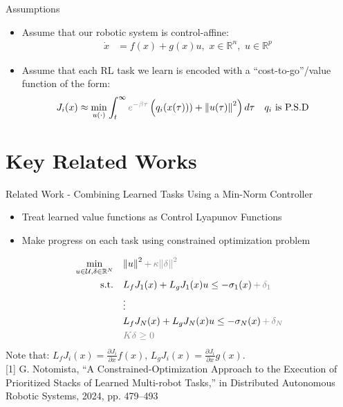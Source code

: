 \begin{frame}{Assumptions}
	\begin{itemize}
		\item{Assume that our robotic system is control-affine:
	\begin{align*}
		\dot{x} &= f(x) + g(x)u, \,\, x \in \mathbb{R}^n, \,\, u \in \mathbb{R}^p
	\end{align*}}
		\item{Assume that each RL task we learn is encoded with a ``cost-to-go''/value function of the form:
	\begin{align*}
		J_i (x) &\approx \min_{u(\cdot)} \int_t^{\infty} { \color{gray} e^{- \beta \tau} } \left( q_i(x(\tau))) + {\lVert u(\tau) \rVert}^2 \right) d \tau && \text{$q_i$ is P.S.D}
	\end{align*}}
	\end{itemize}
\end{frame}

\section{Key Related Works}

\begin{frame}{Related Work - Combining Learned Tasks Using a Min-Norm Controller}
	\begin{itemize}
		\item{Treat learned value functions as Control Lyapunov Functions}
		\item{Make progress on each task using constrained optimization problem}
	\end{itemize}
	\begin{align*}
		\min_{u \in \mathcal{U}, \delta \in \mathbb{R}^N} \quad & { \lVert u \rVert }^2 \, { \color{gray} + \, \kappa { \lVert \delta \rVert }^2 } \\
		\textrm{s.t.} \quad & L_f {J}_1 (x) + L_g {J}_1 (x) u \le - \sigma_1(x) \, {\color{gray} + \, \delta_1 } \\
                \quad & \vdots \\
		\quad & L_f {J}_N (x) + L_g {J}_N (x) u \le - \sigma_N(x) \, {\color{gray} + \, \delta_N } \\
		\quad & { \color{gray} K \delta \ge 0 }
	\end{align*}
        Note that: $L_f {J}_i(x) = \frac{\partial {J}_i}{\partial x} f(x), \, L_g {J}_i(x) = \frac{\partial {J}_i}{\partial x} g(x)$.\\
	\seprule
	\footnotesize{[1] G. Notomista, “A Constrained-Optimization Approach to the Execution of Prioritized Stacks of Learned Multi-robot Tasks,” in Distributed Autonomous Robotic Systems, 2024, pp. 479–493}
\end{frame}


